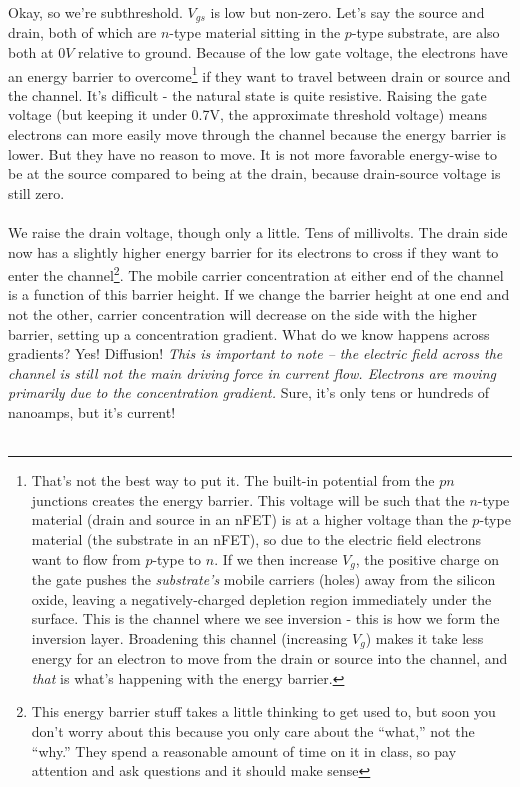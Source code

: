 Okay, so we're subthreshold. $V_{gs}$ is low but non-zero. Let's say the source and drain, both of which are $n$-type material sitting in the $p$-type substrate, are also both at $0V$ relative to ground. Because of the low gate voltage, the electrons have an energy barrier to overcome\footnote{That's not the best way to put it. The built-in potential from the $pn$ junctions creates the energy barrier. This voltage will be such that the $n$-type material (drain and source in an nFET) is at a higher voltage than the $p$-type material (the substrate in an nFET), so due to the electric field electrons want to flow from $p$-type to $n$. If we then increase $V_g$, the positive charge on the gate pushes the \emph{substrate's} mobile carriers (holes) away from the silicon oxide, leaving a negatively-charged depletion region immediately under the surface. This is the channel where we see inversion - this is how we form the inversion layer. Broadening this channel (increasing $V_g$) makes it take less energy for an electron to move from the drain or source into the channel, and \emph{that} is what's happening with the energy barrier.} if they want to travel between drain or source and the channel. It's difficult - the natural state is quite resistive. Raising the gate voltage (but keeping it under 0.7V, the approximate threshold voltage) means electrons can more easily move through the channel because the energy barrier is lower. But they have no reason to move. It is not more favorable energy-wise to be at the source compared to being at the drain, because drain-source voltage is still zero.\\ \\
We raise the drain voltage, though only a little. Tens of millivolts. The drain side now has a slightly higher energy barrier for its electrons to cross if they want to enter the channel\footnote{This energy barrier stuff takes a little thinking to get used to, but soon you don't worry about this because you only care about the ``what,'' not the ``why.'' They spend a reasonable amount of time on it in class, so pay attention and ask questions and it should make sense}. The mobile carrier concentration at either end of the channel is a function of this barrier height. If we change the barrier height at one end and not the other, carrier concentration will decrease on the side with the higher barrier, setting up a concentration gradient. What do we know happens across gradients? Yes! Diffusion! \emph{This is important to note – the electric field across the channel is still not the main driving force in current flow. Electrons are moving primarily due to the concentration gradient.} Sure, it's only tens or hundreds of nanoamps, but it's current!\\ \\
